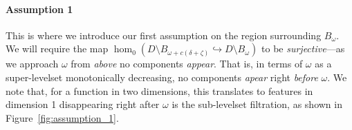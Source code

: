 \paragraph{Assumption 1}

This is where we introduce our first assumption on the region surrounding $B_\omega$.
We will require the map $\hom_0(D\setminus B_{\omega+c(\delta+\zeta)}\hookrightarrow D\setminus B_\omega)$ to be \emph{surjective}---as we approach $\omega$ from \emph{above} no components \emph{appear}.
That is, in terms of $\omega$ as a super-levelset monotonically decreasing, no components \emph{apear} right \emph{before} $\omega$.
We note that, for a function in two dimensions, this translates to features in dimension 1 disappearing right after $\omega$ is the sub-levelset filtration, as shown in Figure~\ref{fig:assumption_1}.



